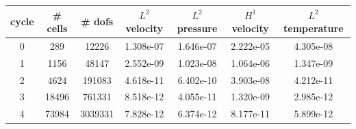 \documentclass[10pt]{report}
\begin{document}
\begin{table}[H]
\begin{center}
\begin{tabular}{|c|c|c|c|c|c|c|} \hline
cycle & \# cells & \# dofs & $L^2$ velocity & $L^2$ pressure & $H^1$ velocity & $L^2$ temperature\\ \hline
0 & 289 & 12226 & 1.308e-07 & 1.646e-07 & 2.222e-05 & 4.305e-08\\ \hline
1 & 1156 & 48147 & 2.552e-09 & 1.023e-08 & 1.064e-06 & 1.347e-09\\ \hline
2 & 4624 & 191083 & 4.618e-11 & 6.402e-10 & 3.903e-08 & 4.212e-11\\ \hline
3 & 18496 & 761331 & 8.518e-12 & 4.055e-11 & 1.320e-09 & 2.985e-12\\ \hline
4 & 73984 & 3039331 & 7.828e-12 & 6.374e-12 & 8.177e-11 & 5.899e-12\\ \hline
\end{tabular}
\end{center}
\end{table}
\end{document}
